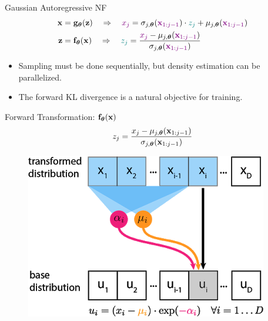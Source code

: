 \documentclass{beamer}
\begin{document}
\begin{frame}{Gaussian Autoregressive NF}
	\vspace{-0.5cm}
	\begin{align*}
		\mathbf{x} &= \mathbf{g}_{\boldsymbol{\theta}}(\mathbf{z}) \quad \Rightarrow \quad {\color{violet} x_j} = \sigma_{j, \boldsymbol{\theta}} ({\color{violet} \mathbf{x}_{1:j-1}}) \cdot {\color{teal} z_j} + \mu_{j, \boldsymbol{\theta}}({\color{violet} \mathbf{x}_{1:j-1}}) \\
		\mathbf{z} &= \mathbf{f}_{\boldsymbol{\theta}}(\mathbf{x}) \quad \Rightarrow \quad {\color{teal} z_j} = \frac{{\color{violet}x_j} - \mu_{j, \boldsymbol{\theta}}({\color{violet}\mathbf{x}_{1:j-1}})}{\sigma_{j, \boldsymbol{\theta}} ({\color{violet}\mathbf{x}_{1:j-1}})}
	\end{align*}
	
	\begin{itemize}
		\item Sampling must be done sequentially, but density estimation can be parallelized.
		\item The forward KL divergence is a natural objective for training.
	\end{itemize}
	\vspace{-0.3cm}
	
	\begin{minipage}[t]{0.65\columnwidth}
		\begin{block}{Forward Transformation: $\mathbf{f}_{\boldsymbol{\theta}}(\mathbf{x})$}
			\[
				z_j = \frac{x_j - \mu_{j, \boldsymbol{\theta}}(\mathbf{x}_{1:j-1})}{\sigma_{j, \boldsymbol{\theta}} (\mathbf{x}_{1:j-1}) }
			\]
			\vspace{-0.4cm}
		\end{block}
	\end{minipage}%
	\begin{minipage}[t]{0.35\columnwidth}
		\begin{figure}[h]
			\centering
			\includegraphics[width=.9\linewidth]{figs/af_iaf_explained_2.png}
		\end{figure}
	\end{minipage} \\
	

\end{frame}
\end{document}
